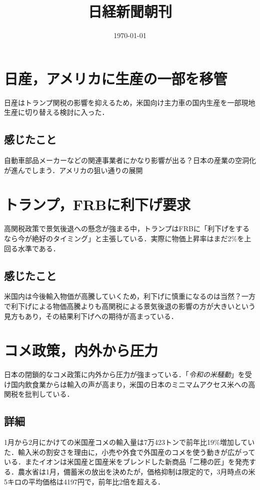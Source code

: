 \documentclass{ltjsarticle}
\title{日経新聞朝刊}
\author{}
\date{\today}
\begin{document}
\maketitle

\section{日産，アメリカに生産の一部を移管}

日産はトランプ関税の影響を抑えるため，米国向け主力車の国内生産を一部現地生産に切り替える検討に入った．

\subsection{感じたこと}

自動車部品メーカーなどの関連事業者にかなり影響が出る？日本の産業の空洞化が進んでしまう．アメリカの狙い通りの展開



\section{トランプ，FRBに利下げ要求}

高関税政策で景気後退への懸念が強まる中，トランプはFRBに「利下げをするなら今が絶好のタイミング」と主張している．実際に物価上昇率はまだ2\%を上回る水準である．


\subsection{感じたこと}

米国内は今後輸入物価が高騰していくため，利下げに慎重になるのは当然？一方で利下げによる物価高騰よりも高関税による景気後退の影響の方が大きいという見方もあり，その結果利下げへの期待が高まっている．


\section{コメ政策，内外から圧力}

日本の閉鎖的なコメ政策に内外から圧力が強まっている．「\emph{令和の米騒動}」を受け国内飲食業からは輸入の声が高まり，米国の日本のミニマムアクセス米への高関税を批判している．

\subsection{詳細}

1月から2月にかけての米国産コメの輸入量は7万423トンで前年比19\%増加していた．輸入米の割安さを理由に，小売や外食で外国産のコメを使う動きが広がっている．またイオンは米国産と国産米をブレンドした新商品「二穂の匠」を発売する．農水省は1月，備蓄米の放出を決めたが，価格抑制は限定的で，3月時点の米5キロの平均価格は4197円で，前年比2倍を超える．
\end{document}
